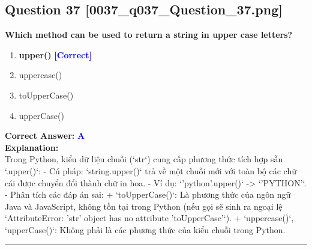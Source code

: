 \documentclass[11pt,a4paper]{article}
\begin{document}
\begin{minipage}{\textwidth}
\subsection*{Question 37 \quad \footnotesize{[0037_q037_Question_37.png]}}
\noindent \textbf{Which method can be used to return a string in upper case letters?}

\begin{enumerate}[label=\Alph*.]
    \item \textbf{upper()} \hfill \textcolor{blue}{\textbf{[Correct]}}
    \item uppercase()
    \item toUpperCase()
    \item upperCase()
\end{enumerate}

\noindent \textbf{Correct Answer:} \textcolor{blue}{\textbf{A}} \\[4pt]
\noindent \textbf{Explanation:}\\
Trong Python, kiểu dữ liệu chuỗi (`str`) cung cấp phương thức tích hợp sẵn `.upper()`:\newline
- Cú pháp: `string.upper()` trả về một chuỗi mới với toàn bộ các chữ cái được chuyển đổi thành chữ in hoa.\newline
- Ví dụ: `'python'.upper()` -> `'PYTHON'`.\newline
- Phân tích các đáp án sai:\newline
  + `toUpperCase()`: Là phương thức của ngôn ngữ Java và JavaScript, không tồn tại trong Python (nếu gọi sẽ sinh ra ngoại lệ `AttributeError: 'str' object has no attribute 'toUpperCase'`).\newline
  + `uppercase()`, `upperCase()`: Không phải là các phương thức của kiểu chuỗi trong Python.
\end{minipage}
\vspace{0.8cm}
\hrule
\vspace{0.5cm}
\end{document}
